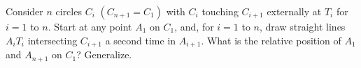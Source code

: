 Consider $n$ circles $C_i$ $(C_{n+1} = C_1)$ with $C_i$ touching $C_{i+1}$ externally at $T_i$ for $i = 1$ to $n$. Start at any point $A_1$ on $C_1$, and, for $i = 1$ to $n$, draw straight lines $A_iT_i$ intersecting $C_{i+1}$ a second time in $A_{i+1}$. What is the relative position of $A_1$ and $A_{n+1}$ on $C_1$? Generalize.
